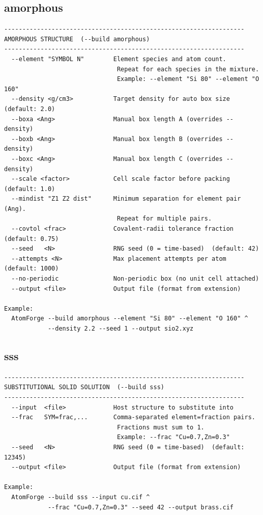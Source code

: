 \subsection{amorphous}

\begin{lstlisting}
------------------------------------------------------------------
AMORPHOUS STRUCTURE  (--build amorphous)
------------------------------------------------------------------
  --element "SYMBOL N"        Element species and atom count.
                               Repeat for each species in the mixture.
                               Example: --element "Si 80" --element "O 160"
  --density <g/cm3>           Target density for auto box size  (default: 2.0)
  --boxa <Ang>                Manual box length A (overrides --density)
  --boxb <Ang>                Manual box length B (overrides --density)
  --boxc <Ang>                Manual box length C (overrides --density)
  --scale <factor>            Cell scale factor before packing  (default: 1.0)
  --mindist "Z1 Z2 dist"      Minimum separation for element pair (Ang).
                               Repeat for multiple pairs.
  --covtol <frac>             Covalent-radii tolerance fraction  (default: 0.75)
  --seed   <N>                RNG seed (0 = time-based)  (default: 42)
  --attempts <N>              Max placement attempts per atom  (default: 1000)
  --no-periodic               Non-periodic box (no unit cell attached)
  --output <file>             Output file (format from extension)

Example:
  AtomForge --build amorphous --element "Si 80" --element "O 160" ^
            --density 2.2 --seed 1 --output sio2.xyz
\end{lstlisting}

\clearpage

\subsection{sss}

\begin{lstlisting}
------------------------------------------------------------------
SUBSTITUTIONAL SOLID SOLUTION  (--build sss)
------------------------------------------------------------------
  --input  <file>             Host structure to substitute into
  --frac   SYM=frac,...       Comma-separated element=fraction pairs.
                               Fractions must sum to 1.
                               Example: --frac "Cu=0.7,Zn=0.3"
  --seed   <N>                RNG seed (0 = time-based)  (default: 12345)
  --output <file>             Output file (format from extension)

Example:
  AtomForge --build sss --input cu.cif ^
            --frac "Cu=0.7,Zn=0.3" --seed 42 --output brass.cif
\end{lstlisting}


